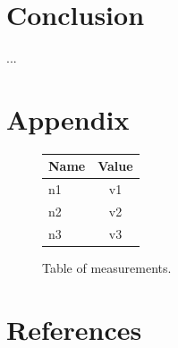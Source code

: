 \documentclass[11pt,a4paper]{article}
\begin{document}
\section{Conclusion}

...

\newpage %

\section{Appendix}

\begin{figure}[H]
    \begin{center}
        \begin{tabular}{|l|c|}
            \hline
            \textbf{Name} & \textbf{Value} \\
            \hline\hline
            n1 & v1 \\\hline
            n2 & v2 \\\hline
            n3 & v3 \\\hline
        \end{tabular}
    \end{center}
    \caption{Table of measurements.}
    \label{fig:measurements}
\end{figure}

\newpage %

\section{References}

\begin{flushleft}
    
\end{flushleft}


\end{document}
